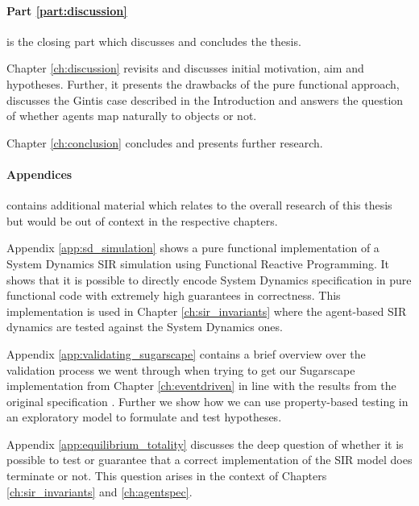 \medskip

\paragraph{Part \ref{part:discussion}} is the closing part which discusses and concludes the thesis. 
\medskip



Chapter \ref{ch:discussion} revisits and discusses initial motivation, aim and hypotheses. Further, it presents the drawbacks of the pure functional approach, discusses the Gintis case described in the Introduction and answers the question of whether agents map naturally to objects or not.

\medskip

Chapter \ref{ch:conclusion} concludes and presents further research.

\paragraph{Appendices} contains additional material which relates to the overall research of this thesis but would be out of context in the respective chapters.
\medskip

Appendix \ref{app:sd_simulation} shows a pure functional implementation of a System Dynamics SIR simulation using Functional Reactive Programming. It shows that it is possible to directly encode System Dynamics specification in pure functional code with extremely high guarantees in correctness. This implementation is used in Chapter \ref{ch:sir_invariants} where the agent-based SIR dynamics are tested against the System Dynamics ones.

\medskip

Appendix \ref{app:validating_sugarscape} contains a brief overview over the validation process we went through when trying to get our Sugarscape implementation from Chapter \ref{ch:eventdriven} in line with the results from the original specification \cite{epstein_growing_1996}. Further we show how we can use property-based testing in an exploratory model to formulate and test hypotheses.

\medskip

Appendix \ref{app:equilibrium_totality} discusses the deep question of whether it is possible to test or guarantee that a correct implementation of the SIR model does terminate or not. This question arises in the context of Chapters \ref{ch:sir_invariants} and \ref{ch:agentspec}.